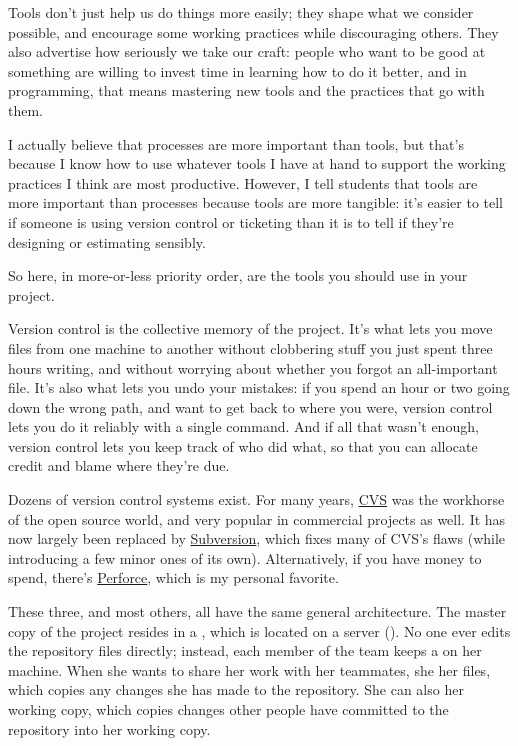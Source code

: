 \documentclass{report}
\begin{document}
Tools don't just help us do things more easily; they shape what we
consider possible, and encourage some working practices while
discouraging others.  They also advertise how seriously we take our
craft: people who want to be good at something are willing to invest
time in learning how to do it better, and in programming, that means
mastering new tools and the practices that go with them.

I actually believe that processes are more important than tools, but
that's because I know how to use whatever tools I have at hand to
support the working practices I think are most productive.  However, I
tell students that tools are more important than processes because
tools are more tangible: it's easier to tell if someone is using
version control or ticketing than it is to tell if they're designing
or estimating sensibly.

So here, in more-or-less priority order, are the tools you should use
in your project.


Version control is the collective memory of the project.  It's what
lets you move files from one machine to another without clobbering
stuff you just spent three hours writing, and without worrying about
whether you forgot an all-important file.  It's also what lets you
undo your mistakes: if you spend an hour or two going down the wrong
path, and want to get back to where you were, version control lets you
do it reliably with a single command.  And if all that wasn't enough,
version control lets you keep track of who did what, so that you can
allocate credit and blame where they're due.

Dozens of version control systems exist.  For many years, \url{CVS}
was the workhorse of the open source world, and very popular in
commercial projects as well.  It has now largely been replaced by
\url{Subversion}, which fixes many of CVS's flaws (while introducing a
few minor ones of its own).  Alternatively, if you have money to
spend, there's \url{Perforce}, which is my personal favorite.

These three, and most others, all have the same general architecture.
The master copy of the project resides in a ,
which is located on a server
().  No one ever edits the
repository files directly; instead, each member of the team keeps a
 on her machine.  When she wants to share her
work with her teammates, she  her files, which copies
any changes she has made to the repository.  She can also
 her working copy, which copies changes other people
have committed to the repository into her working copy.
\end{document}
